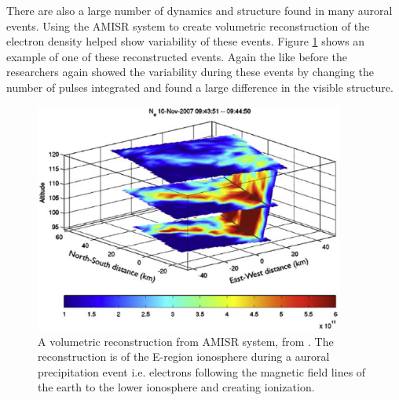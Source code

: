 There are also a large number of dynamics and structure found in many auroral events. Using the AMISR system to create volumetric reconstruction of the electron density \cite{Semeter2009738} helped show variability of these events. Figure \ref{fig:eregionact} shows an example of one of these reconstructed events.  Again the like before the researchers again showed the variability during these events by changing the number of pulses integrated and found a large difference in the visible structure.
\begin{figure}[!t]
\centering
\includegraphics[width=4.0in]{threedamisr}
\caption{A volumetric reconstruction from AMISR system, from \cite{Semeter2009738}. The reconstruction is of the E-region ionosphere during a auroral precipitation event i.e. electrons following the magnetic field lines of the earth to the lower ionosphere and creating ionization.}
\label{fig:eregionact}
\end{figure}
%



